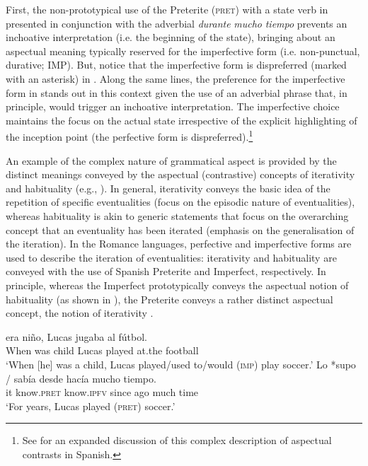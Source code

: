 \documentclass[output=paper,modfonts,nonflat,newtxmath]{langsci/langscibook}
\begin{document}
First, the non-prototypical use of the Preterite (\textsc{pret}) with a state verb in  presented in conjunction with the adverbial \textit{durante} \textit{mucho} \textit{tiempo} prevents an inchoative interpretation (i.e. the beginning of the state), bringing about an aspectual meaning typically reserved for the imperfective form (i.e. non-punctual, durative; IMP). But, notice that the imperfective form is dispreferred (marked with an asterisk) in . Along the same lines, the preference for the imperfective form in  stands out in this context given the use of an adverbial phrase that, in principle, would trigger an inchoative interpretation. The imperfective choice maintains the focus on the actual state irrespective of the explicit highlighting of the inception point (the perfective form is dispreferred).\footnote{See \citet{Doiz2002} for an expanded discussion of this complex description of aspectual contrasts in Spanish.}

An example of the complex nature of grammatical aspect is provided by the distinct meanings conveyed by the aspectual (contrastive) concepts of iterativity and habituality (e.g., \citealt{deSwart1998, Langacker1999}). In general, iterativity conveys the basic idea of the repetition of specific eventualities (focus on the episodic nature of eventualities), whereas habituality is akin to generic statements that focus on the overarching concept that an eventuality has been iterated (emphasis on the generalisation of the iteration). In the Romance languages, perfective and imperfective forms are used to describe the iteration of eventualities: iterativity and habituality are conveyed with the use of Spanish Preterite and Imperfect, respectively. In principle, whereas the Imperfect prototypically conveys the aspectual notion of habituality (as shown in ), the Preterite conveys a rather distinct aspectual concept, the notion of iterativity .

\ea \label{ex:salaberry:2}
\begin{xlist}
\ex \label{ex:salaberry:2a}
 {era} {niño,} {Lucas} {jugaba} {al} {fútbol}.\\
When was child Lucas played at.the football \\
\glt  ‘When [he] was a child, Lucas played/used to/would (\textsc{imp}) play soccer.’
\ex \label{ex:salaberry:2b}
\gll Lo *supo  / sabía  desde hacía mucho tiempo.\\
it know.\textsc{pret} {} know.\textsc{ipfv} since ago much time\\
\glt ‘For years, Lucas played (\textsc{pret}) soccer.’
\end{xlist}
\z
\end{document}
